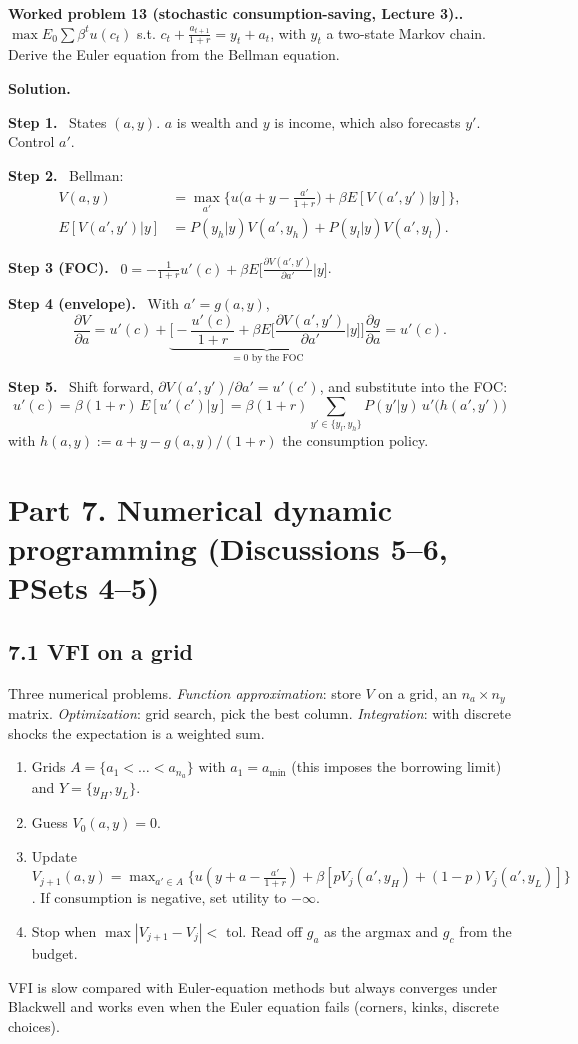 \documentclass[12pt]{article}
\newcommand{\st}[1]{\par\smallskip\textbf{Step #1.}\ }
\newcommand{\ans}[1]{\[\boxed{\ #1\ }\]}
\newcommand{\prob}[1]{\par\bigskip\textbf{Worked problem #1.}\ }
\newcommand{\sol}{\par\smallskip\textbf{Solution.}\par}
\begin{document}
\prob{13 (stochastic consumption-saving, Lecture 3).} $\max E_0\sum\beta^tu(c_t)$ s.t. $c_t+\frac{a_{t+1}}{1+r}=y_t+a_t$, with $y_t$ a two-state Markov chain. Derive the Euler equation from the Bellman equation.
\sol
\st{1} States $(a,y)$. $a$ is wealth and $y$ is income, which also forecasts $y'$. Control $a'$.
\st{2} Bellman:
\begin{align*}
V(a,y)&=\max_{a'}\Big\{u\Big(a+y-\frac{a'}{1+r}\Big)+\beta E[V(a',y')|y]\Big\},\\
E[V(a',y')|y]&=P(y_h|y)V(a',y_h)+P(y_l|y)V(a',y_l).
\end{align*}
\st{3 (FOC)} $0=-\frac{1}{1+r}u'(c)+\beta E\big[\frac{\partial V(a',y')}{\partial a'}\big|y\big]$.
\st{4 (envelope)} With $a'=g(a,y)$,
\[
\frac{\partial V}{\partial a}=u'(c)+\underbrace{\Big[-\frac{u'(c)}{1+r}+\beta E\Big[\frac{\partial V(a',y')}{\partial a'}\Big|y\Big]\Big]}_{=0\text{ by the FOC}}\frac{\partial g}{\partial a}=u'(c).
\]
\st{5} Shift forward, $\partial V(a',y')/\partial a'=u'(c')$, and substitute into the FOC:
\ans{u'(c)=\beta(1+r)\,E[u'(c')|y]=\beta(1+r)\sum_{y'\in\{y_l,y_h\}}P(y'|y)\,u'\big(h(a',y')\big)}
with $h(a,y):=a+y-g(a,y)/(1+r)$ the consumption policy.

\section*{Part 7. Numerical dynamic programming (Discussions 5--6, PSets 4--5)}

\subsection*{7.1 VFI on a grid}
Three numerical problems. \emph{Function approximation}: store $V$ on a grid,
an $n_a\times n_y$ matrix. \emph{Optimization}: grid search, pick the best
column. \emph{Integration}: with discrete shocks the expectation is a weighted sum.
\begin{enumerate}
\item Grids $A=\{a_1<\dots<a_{n_a}\}$ with $a_1=a_{\min}$ (this imposes the borrowing limit) and $Y=\{y_H,y_L\}$.
\item Guess $V_0(a,y)=0$.
\item Update $V_{j+1}(a,y)=\max_{a'\in A}\{u(y+a-\frac{a'}{1+r})+\beta[pV_j(a',y_H)+(1-p)V_j(a',y_L)]\}$. If consumption is negative, set utility to $-\infty$.
\item Stop when $\max|V_{j+1}-V_j|<$ tol. Read off $g_a$ as the argmax and $g_c$ from the budget.
\end{enumerate}
VFI is slow compared with Euler-equation methods but always converges under
Blackwell and works even when the Euler equation fails (corners, kinks,
discrete choices).
\end{document}
